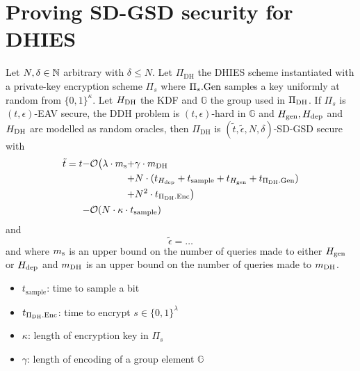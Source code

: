 \section{Proving SD-GSD security for DHIES}


\begin{theorem} \label{theorem:sdgsd-security}
	Let $N, \delta \in \mathbb{N}$ arbitrary with $\delta \le N$. Let $\Pi_{\mathrm{DH}}$ the DHIES scheme instantiated with a private-key encryption scheme $\Pi_s$ where $\Pi_s.\mathrm{Gen}$ samples a key uniformly at random from $\{0, 1\}^\kappa$. Let $H_\mathrm{DH}$ the KDF and $\mathbb{G}$ the group used in $\Pi_{\mathrm{DH}}$. If $\Pi_s$ is $(t, \epsilon)$-EAV secure, the DDH problem is $(t, \epsilon)$-hard in $\mathbb{G}$ and $H_\mathrm{gen}, H_\mathrm{dep}$ and $H_\mathrm{DH}$ are modelled as random oracles, then $\Pi_{\mathrm{DH}}$ is $(\tilde{t}, \tilde{\epsilon}, N, \delta)$-SD-GSD secure with
	\[
		\tilde{t} = t \begin{aligned}[t]
			- & \mathcal{O}\big(\lambda \cdot m_\mathrm{s}
			\begin{aligned}[t]
				+ & \gamma \cdot m_\mathrm{DH} \\ + & N \cdot (t_{H_\mathrm{dep}} + t_{\mathrm{sample}} + t_{H_\mathrm{gen}} + t_{\Pi_{\mathrm{DH}}.\mathrm{Gen}})  \\ + & N^2 \cdot t_{\Pi_{\mathrm{DH}}.\mathrm{Enc}}\big) \\
			\end{aligned} \\
			- & \mathcal{O}(N \cdot \kappa \cdot t_{\mathrm{sample}})
		\end{aligned}
	\]
	and
	\[
		\tilde{\epsilon} = \ldots
	\]
	and where $m_\mathrm{s}$ is an upper bound on the number of queries made to either $H_\mathrm{gen}$ or $H_\mathrm{dep}$ and $m_\mathrm{DH}$ is an upper bound on the number of queries made to $m_\mathrm{DH}$. 

	\begin{itemize}
		\item $t_{\mathrm{sample}}$: time to sample a bit
		\item $t_{\Pi_{\mathrm{DH}}.\mathrm{Enc}}$: time to encrypt $s \in \{0, 1\}^\lambda$
		\item $\kappa$: length of encryption key in $\Pi_s$
		\item $\gamma$: length of encoding of a group element $\mathbb{G}$
	\end{itemize}
\end{theorem}

